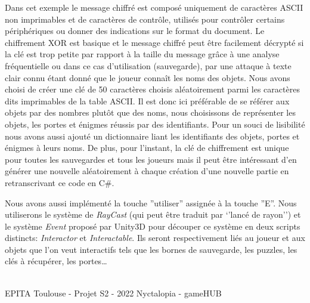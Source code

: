 Dans cet exemple le message chiffré est composé uniquement de caractères ASCII non imprimables et de caractères de contrôle, utilisés pour contrôler certains périphériques ou donner des indications sur le format du document.
\newline
Le chiffrement XOR est basique et le message chiffré peut être facilement décrypté si la clé est trop petite par rapport à la taille du message grâce à une analyse fréquentielle ou dans ce cas d’utilisation (sauvegarde), par une attaque à texte clair connu étant donné que le joueur connaît les noms des objets.
\newline
Nous avons choisi de créer une clé de 50 caractères choisis aléatoirement parmi les caractères dits imprimables de la table ASCII.
Il est donc ici préférable de se référer aux objets par des nombres plutôt que des noms, nous choisissons de représenter les objets, les portes et énigmes réussis par des identifiants.
Pour un souci de lisibilité nous avons aussi ajouté un dictionnaire liant les identifiants des objets, portes et énigmes à leurs noms.
\newline
De plus, pour l’instant, la clé de chiffrement est unique pour toutes les sauvegardes et tous les joueurs mais il peut être intéressant d’en générer une nouvelle aléatoirement à chaque création d’une nouvelle partie en retranscrivant ce code en C\#.

Nous avons aussi implémenté la touche ''utiliser'' assignée à la touche ''E''. Nous utiliserons le système de \emph{RayCast} (qui peut être traduit par ‘’lancé de rayon’’) et le système \emph{Event} proposé par Unity3D pour découper ce système en deux scripts distincts: \emph{Interactor} et \emph{Interactable}. Ils seront respectivement liés au joueur et aux objets que l’on veut interactifs tels que les bornes de sauvegarde, les puzzles, les clés à récupérer, les portes…

    
    
\vfill
\noindent\makebox[\linewidth]{\rule{.8\paperwidth}{.6pt}}\\[0.2cm]
EPITA Toulouse - Projet S2 - 2022 \hfill Nyctalopia - gameHUB
\noindent\makebox[\linewidth]{\rule{.8\paperwidth}{.6pt}}
\newpage


